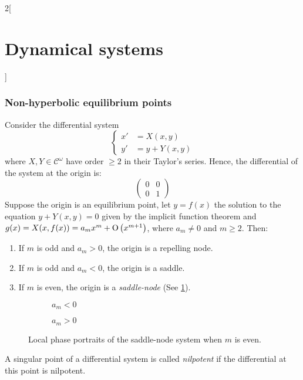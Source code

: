 \documentclass[../../../main_math.tex]{subfiles}
\begin{document}
\begin{multicols}{2}[\section{Dynamical systems}]
  \subsubsection{Non-hyperbolic equilibrium points}
  \begin{theorem}\label{DS_thmA}
    Consider the differential system
    $$
      \left\{
      \begin{aligned}
        {x}' & = X(x,y)    \\
        {y}' & = y+ Y(x,y)
      \end{aligned}
      \right.
    $$
    where $X,Y\in\mathcal{C}^\omega$ have order $\geq 2$ in their Taylor's series. Hence, the differential of the system at the origin is:
    $$\begin{pmatrix}
        0 & 0 \\
        0 & 1
      \end{pmatrix}$$ Suppose the origin is an equilibrium point, let $y=f(x)$ the solution to the equation $y+Y(x,y)=0$ given by the implicit function theorem and $g(x)=X(x,f(x))=a_mx^m+\mathrm{O}\left(x^{m+1}\right)$, where $a_m\ne 0$ and $m\geq 2$. Then:
    \begin{enumerate}
      \item If $m$ is odd and $a_m>0$, the origin is a repelling node.
      \item If $m$ is odd and $a_m<0$, the origin is a saddle.
      \item If $m$ is even, the origin is a \emph{saddle-node} (See \cref{DS_meven}).
    \end{enumerate}
    \begin{figure}[H]
      \centering
      \begin{subfigure}[b]{0.45\linewidth}
        \centering
        
        \caption{$a_m<0$}
      \end{subfigure}
      \hfill
      \begin{subfigure}[b]{0.45\linewidth}
        \centering
        
        \caption{$a_m>0$}
      \end{subfigure}
      \caption{Local phase portraits of the saddle-node system when $m$ is even.}
      \label{DS_meven}
    \end{figure}
  \end{theorem}
  \begin{definition}
    A singular point of a differential system is called \emph{nilpotent} if the differential at this point is nilpotent.

\end{definition}
\end{multicols}
\end{document}
